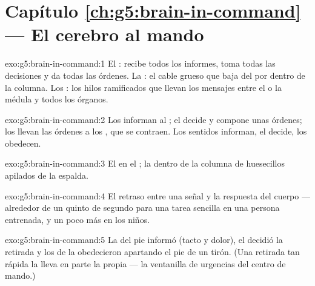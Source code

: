 \section*{Capítulo \ref{ch:g5:brain-in-command} --- El cerebro al mando}

\begin{solution}{exo:g5:brain-in-command:1}
El : recibe todos los informes, toma todas las decisiones y da
todas las órdenes. La : el cable grueso que baja del
 por dentro de la columna. Los : los hilos ramificados
que llevan los mensajes entre el  o la médula y todos los
órganos.
\end{solution}

\begin{solution}{exo:g5:brain-in-command:2}
Los  informan al ; el  decide y
compone unas órdenes; los  llevan las órdenes a los ,
que se contraen. Los sentidos informan, el  decide, los
 obedecen.
\end{solution}

\begin{solution}{exo:g5:brain-in-command:3}
El  en el ; la  dentro de la columna de
huesecillos apilados de la espalda.
\end{solution}

\begin{solution}{exo:g5:brain-in-command:4}
El retraso entre una señal y la respuesta del cuerpo --- alrededor de
un quinto de segundo para una tarea sencilla en una persona entrenada,
y un poco más en los niños.
\end{solution}

\begin{solution}{exo:g5:brain-in-command:5}
La  del pie informó (tacto y dolor), el  decidió
la retirada y los  de la  obedecieron apartando el pie
de un tirón. (Una retirada tan rápida la lleva en parte la propia
 --- la ventanilla de urgencias del centro de mando.)
\end{solution}

